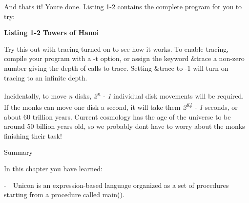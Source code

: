 And that{\textquotesingle}s it! You{\textquotesingle}re done. Listing
1-2 contains the complete program for you to try:

\bigskip

{\sffamily\bfseries Listing 1-2}
{\sffamily\bfseries Towers of Hanoi}


Try this out with tracing turned on to see how it works.
To enable tracing, compile your program with a
\textsf{{}-t} option, or assign the keyword \textsf{\&trace} a non-zero
number giving the depth of calls to trace. Setting \textsf{\&trace} to
-1 will turn on tracing to an infinite depth.

Incidentally, to move \textit{n} disks,
\textit{2}\textit{\textsuperscript{n}}\textit{ - 1} individual disk
movements will be required. If the monks can move one disk a second, it
will take them \textit{2}\textit{\textsuperscript{64}}\textit{ - 1}
seconds, or about 60 trillion years. Current cosmology has the age of
the universe to be around 50 billion years old, so we probably
don{\textquotesingle}t have to worry about the monks finishing their
task!

{\sffamily
Summary}

In this chapter you have learned:

{}-\ \ Unicon is an expression-based language organized as a set of
procedures starting from a procedure called \textsf{main()}.

